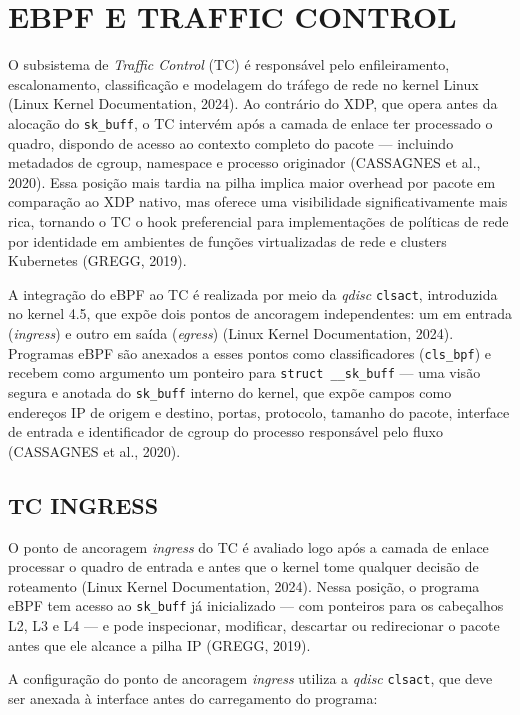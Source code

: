 \chapter{EBPF E TRAFFIC CONTROL}
\label{cap:tc}

O subsistema de \textit{Traffic Control} (TC) é responsável pelo enfileiramento,
escalonamento, classificação e modelagem do tráfego de rede no kernel Linux
(Linux Kernel Documentation, 2024). Ao contrário do XDP, que opera antes da alocação
do \texttt{sk\_buff}, o TC intervém após a camada de enlace ter processado o quadro,
dispondo de acesso ao contexto completo do pacote — incluindo metadados de cgroup,
namespace e processo originador (CASSAGNES et al., 2020). Essa posição mais tardia
na pilha implica maior overhead por pacote em comparação ao XDP nativo, mas oferece
uma visibilidade significativamente mais rica, tornando o TC o hook preferencial para
implementações de políticas de rede por identidade em ambientes de funções virtualizadas
de rede e clusters Kubernetes (GREGG, 2019).

A integração do eBPF ao TC é realizada por meio da \textit{qdisc} \texttt{clsact},
introduzida no kernel 4.5, que expõe dois pontos de ancoragem independentes: um em
entrada (\textit{ingress}) e outro em saída (\textit{egress}) (Linux Kernel Documentation,
2024). Programas eBPF são anexados a esses pontos como classificadores (\texttt{cls\_bpf})
e recebem como argumento um ponteiro para \texttt{struct \_\_sk\_buff} — uma visão
segura e anotada do \texttt{sk\_buff} interno do kernel, que expõe campos como endereços
IP de origem e destino, portas, protocolo, tamanho do pacote, interface de entrada e
identificador de cgroup do processo responsável pelo fluxo (CASSAGNES et al., 2020).

\section{TC INGRESS}

O ponto de ancoragem \textit{ingress} do TC é avaliado logo após a camada de enlace
processar o quadro de entrada e antes que o kernel tome qualquer decisão de roteamento
(Linux Kernel Documentation, 2024). Nessa posição, o programa eBPF tem acesso ao
\texttt{sk\_buff} já inicializado — com ponteiros para os cabeçalhos L2, L3 e L4 — e pode
inspecionar, modificar, descartar ou redirecionar o pacote antes que ele alcance a pilha
IP (GREGG, 2019).

A configuração do ponto de ancoragem \textit{ingress} utiliza a \textit{qdisc}
\texttt{clsact}, que deve ser anexada à interface antes do carregamento do programa:

